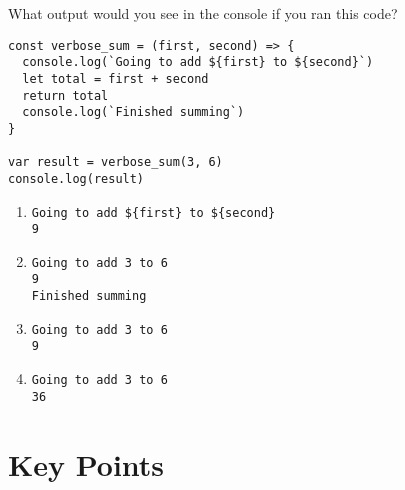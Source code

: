 
What output would you see in the console if you ran this code?

\begin{verbatim}
const verbose_sum = (first, second) => {
  console.log(`Going to add ${first} to ${second}`)
  let total = first + second
  return total
  console.log(`Finished summing`)
}

var result = verbose_sum(3, 6)
console.log(result)
\end{verbatim}

\begin{enumerate}
\item
  \texttt{Going\ to\ add\ \$\{first\}\ to\ \$\{second\}}\\
  \texttt{9}
\item
  \texttt{Going\ to\ add\ 3\ to\ 6}\\
  \texttt{9}\\
  \texttt{Finished\ summing}
\item
  \texttt{Going\ to\ add\ 3\ to\ 6}\\
  \texttt{9}
\item
  \texttt{Going\ to\ add\ 3\ to\ 6}\\
  \texttt{36}
\end{enumerate}

\section*{Key Points}


